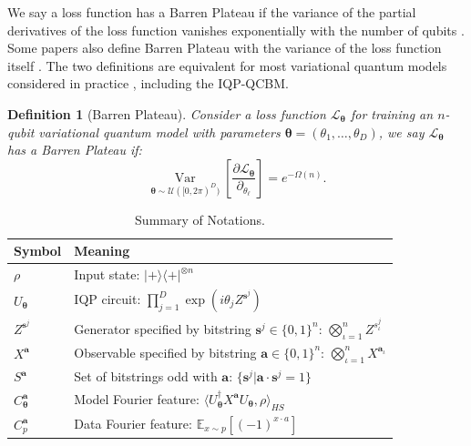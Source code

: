 \documentclass[a4paper,onecolumn,notitlepage,nofootinbib,longbibliography,superscriptaddress, floatfix, pra, aps, 10pt]{revtex4-2}
\newcommand{\vttheta}{{\bm{\theta}}}
\newcommand{\vta}{{\bm{a}}}
\newcommand{\vtsj}{{\bm{s}^j}}
\newcommand{\vts}{{\bm{s}}}
\newtheorem{definition}{Definition}
\begin{document}

We say a loss function has a Barren Plateau if the variance of the partial derivatives of the loss function vanishes exponentially with the number of qubits \cite{mcclean_barren_2018}. Some papers also define Barren Plateau with the variance of the loss function itself \cite{ragone_lie_2024}. The two definitions are equivalent for most variational quantum models considered in practice \cite{Arrasmith_2022}, including the IQP-QCBM.
\begin{definition}[Barren Plateau]
Consider a loss function $\mathcal{L}_\vttheta$ for training an $n$-qubit variational quantum model with parameters $\vttheta = (\theta_1, \dots, \theta_D)$, we say $\mathcal{L}_\vttheta$ has a Barren Plateau if:
\begin{equation}
\operatorname*{Var}_{\vttheta \sim \mathcal{U}([0,2\pi)^D)} [\frac{ \partial \mathcal{L}_\vttheta}{\partial_{\theta_\ell}}] = e^{-\Omega(n)}.
\end{equation}
\end{definition}

\begin{table}[t]
\centering
\begin{tabular}{ll}
Symbol & Meaning \\
\hline
$\rho$ & Input state: $|+\rangle\!\langle+|^{\otimes n}$ \\
$U_{\vttheta}$ & IQP circuit: $\prod_{j=1}^D \exp \left(i\theta_j Z^{\vts^j}\right)$  \\
$Z^{\vts^j}$ & Generator specified by bitstring $\vtsj \in \{0,1\}^n $: $\bigotimes_{\iota=1}^n Z^{s^j_\iota} $\\
$X^\vta$ & Observable specified by bitstring $\vta \in \{0,1\}^n$: $\bigotimes_{\iota=1}^n X^{\vta_\iota} $\\
$S^{\vta}$ & Set of bitstrings odd with $\vta$: $\{ \vtsj \big| \vta \cdot \vtsj = 1 \}$\\
$C^{\vta}_{\vttheta}$ & Model Fourier feature: $\langle U_\vttheta^\dagger X^{\vta}U_\vttheta,\rho\rangle_{HS}$ \\
$C^{\vta}_p$ & Data Fourier feature: $\mathbb E_{x\sim p}[(-1)^{x\cdot a}]$ \\
\end{tabular}
\caption{Summary of Notations.}
\end{table}
\end{document}

